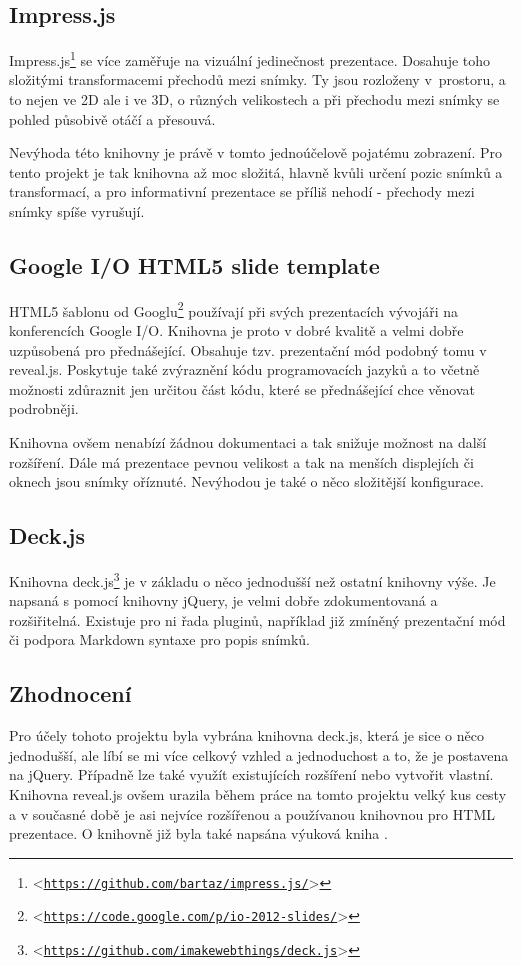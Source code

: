 \documentclass[11pt,twoside,a4paper]{book}
\let\oldUrl\url									%
\renewcommand\url[1]{<\texttt{\oldUrl{#1}}>}
\begin{document}
\subsection{Impress.js}
Impress.js\footnote{\url{https://github.com/bartaz/impress.js/}} se více zaměřuje na vizuální jedinečnost prezentace. Dosahuje toho složitými transformacemi přechodů mezi snímky. Ty jsou rozloženy v~prostoru, a to nejen ve 2D ale i ve 3D, o různých velikostech a při přechodu mezi snímky se pohled působivě otáčí a přesouvá.

Nevýhoda této knihovny je právě v tomto jednoúčelově pojatému zobrazení. Pro tento projekt je tak knihovna až moc složitá, hlavně kvůli určení pozic snímků a transformací, a pro informativní prezentace se příliš nehodí - přechody mezi snímky spíše vyrušují.

\subsection{Google I/O HTML5 slide template}
HTML5 šablonu od Googlu\footnote{\url{https://code.google.com/p/io-2012-slides/}} používají při svých prezentacích vývojáři na konferencích Google I/O. Knihovna je proto v dobré kvalitě a velmi dobře uzpůsobená pro přednášející. Obsahuje tzv. prezentační mód podobný tomu v reveal.js. Poskytuje také zvýraznění kódu programovacích jazyků a to včetně možnosti zdůraznit jen určitou část kódu, které se přednášející chce věnovat podrobněji.

Knihovna ovšem nenabízí žádnou dokumentaci a tak snižuje možnost na další rozšíření. Dále má prezentace pevnou velikost a tak na menších displejích či oknech jsou snímky oříznuté. Nevýhodou je také o něco složitější konfigurace.

\subsection{Deck.js}
Knihovna deck.js\footnote{\url{https://github.com/imakewebthings/deck.js}} je v základu o něco jednodušší než ostatní knihovny výše. Je napsaná s pomocí knihovny jQuery\cite{jQuery}, je velmi dobře zdokumentovaná a rozšiřitelná. Existuje pro ni řada pluginů, například již zmíněný prezentační mód či podpora Markdown syntaxe pro popis snímků. 

\subsection{Zhodnocení}
Pro účely tohoto projektu byla vybrána knihovna deck.js, která je sice o něco jednodušší, ale líbí se mi více celkový vzhled a jednoduchost a to, že je postavena na jQuery. Případně lze také využít existujících rozšíření nebo vytvořit vlastní. Knihovna reveal.js ovšem urazila během práce na tomto projektu velký kus cesty a v současné době je asi nejvíce rozšířenou a používanou knihovnou pro HTML prezentace. O knihovně již byla také napsána výuková kniha \cite{howtobook}.
\end{document}
